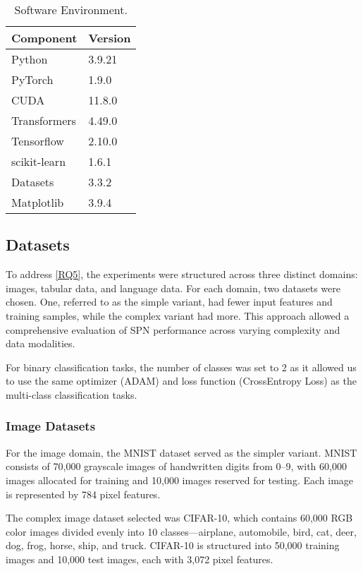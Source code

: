 \begin{table}[h!]
\centering
\caption{Software Environment.}
\label{tab:software}
\begin{tabular}{| m{4cm} | m{4cm} |}
\hline
\textbf{Component} & \textbf{Version} \\
\hline
Python & 3.9.21 \\
PyTorch & 1.9.0 \\
CUDA & 11.8.0 \\
Transformers & 4.49.0 \\
Tensorflow & 2.10.0 \\
scikit-learn & 1.6.1 \\
Datasets & 3.3.2 \\
Matplotlib & 3.9.4 \\
\hline
\end{tabular}
\end{table}

\subsection{Datasets}

To address \ref{RQ5}, the experiments were structured across three distinct domains: images, tabular data, and language data. For each domain, two datasets were chosen. One, referred to as the simple variant, had fewer input features and training samples, while the complex variant had more. This approach allowed a comprehensive evaluation of SPN performance across varying complexity and data modalities.

For binary classification tasks, the number of classes was set to 2 as it allowed us to use the same optimizer (ADAM) and loss function (CrossEntropy Loss) as the multi-class classification tasks.

\subsubsection{Image Datasets}
For the image domain, the MNIST dataset served as the simpler variant. MNIST consists of 70,000 grayscale images of handwritten digits from 0–9, with 60,000 images allocated for training and 10,000 images reserved for testing. Each image is represented by 784 pixel features. 

The complex image dataset selected was CIFAR-10, which contains 60,000 RGB color images divided evenly into 10 classes—airplane, automobile, bird, cat, deer, dog, frog, horse, ship, and truck. CIFAR-10 is structured into 50,000 training images and 10,000 test images, each with 3,072 pixel features.

